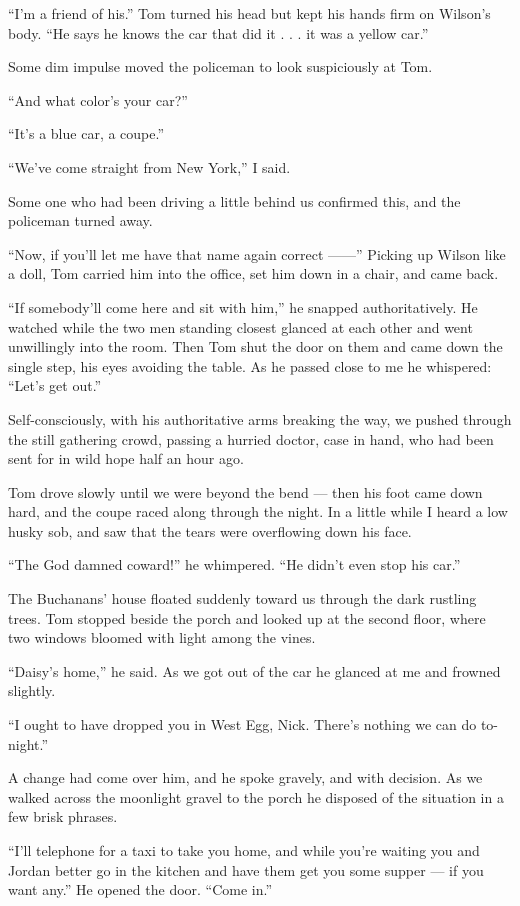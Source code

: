 \documentclass{znotebook}
\begin{document}
``I’m a friend of his.'' Tom turned his head but kept his hands firm on Wilson’s body. ``He says he knows the car that did it . . . it was a yellow car.''

Some dim impulse moved the policeman to look suspiciously at Tom.

``And what color’s your car?''

``It’s a blue car, a coupe.''

``We’ve come straight from New York,'' I said.

Some one who had been driving a little behind us confirmed this, and the policeman turned away.

``Now, if you’ll let me have that name again correct ——'' Picking up Wilson like a doll, Tom carried him into the office, set him down in a chair, and came back.

``If somebody’ll come here and sit with him,'' he snapped authoritatively. He watched while the two men standing closest glanced at each other and went unwillingly into the room. Then Tom shut the door on them and came down the single step, his eyes avoiding the table. As he passed close to me he whispered: ``Let’s get out.''

Self-consciously, with his authoritative arms breaking the way, we pushed through the still gathering crowd, passing a hurried doctor, case in hand, who had been sent for in wild hope half an hour ago.

Tom drove slowly until we were beyond the bend — then his foot came down hard, and the coupe raced along through the night. In a little while I heard a low husky sob, and saw that the tears were overflowing down his face.

``The God damned coward!'' he whimpered. ``He didn’t even stop his car.''

The Buchanans’ house floated suddenly toward us through the dark rustling trees. Tom stopped beside the porch and looked up at the second floor, where two windows bloomed with light among the vines.

``Daisy’s home,'' he said. As we got out of the car he glanced at me and frowned slightly.

``I ought to have dropped you in West Egg, Nick. There’s nothing we can do to-night.''

A change had come over him, and he spoke gravely, and with decision. As we walked across the moonlight gravel to the porch he disposed of the situation in a few brisk phrases.

``I’ll telephone for a taxi to take you home, and while you’re waiting you and Jordan better go in the kitchen and have them get you some supper — if you want any.'' He opened the door. ``Come in.''
\end{document}
